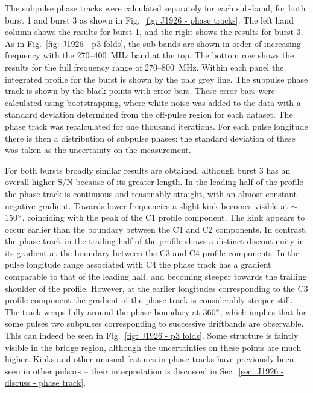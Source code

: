 The subpulse phase tracks were calculated separately for each sub-band, for both burst 1 and burst 3 as shown in Fig.~\ref{fig: J1926 - phase tracks}. The left hand column shows the results for burst 1, and the right shows the results for burst 3. As in Fig.~\ref{fig: J1926 - p3 folds}, the sub-bands are shown in order of increasing frequency with the 270--400~MHz band at the top. The bottom row shows the results for the full frequency range of 270--800~MHz. Within each panel the integrated profile for the burst is shown by the pale grey line. The subpulse phase track is shown by the black points with error bars. These error bars were calculated using bootstrapping, where white noise was added to the data with a standard deviation determined from the off-pulse region for each dataset. The phase track was recalculated for one thousand iterations. For each pulse longitude there is then a distribution of subpulse phases: the standard deviation of these was taken as the uncertainty on the measurement.

For both bursts broadly similar results are obtained, although burst 3 has an overall higher S/N because of its greater length. In the leading half of the profile the phase track is continuous and reasonably straight, with an almost constant negative gradient. Towards lower frequencies a slight kink becomes visible at $\sim$150$^\circ$, coinciding with the peak of the C1 profile component. The kink appears to occur earlier than the boundary between the C1 and C2 components. In contrast, the phase track in the trailing half of the profile shows a distinct discontinuity in its gradient at the boundary between the C3 and C4 profile components. In the pulse longitude range associated with C4 the phase track has a gradient comparable to that of the leading half, and becoming steeper towards the trailing shoulder of the profile. However, at the earlier longitudes corresponding to the C3 profile component the gradient of the phase track is considerably steeper still. The track wraps fully around the phase boundary at $360^\circ$, which implies that for some pulses two subpulses corresponding to successive driftbands are observable. This can indeed be seen in Fig.~\ref{fig: J1926 - p3 folds}. Some structure is faintly visible in the bridge region, although the uncertainties on these points are much higher. Kinks and other unusual features in phase tracks have previously been seen in other pulsars -- their interpretation is discussed in Sec.~\ref{sec: J1926 - discuss - phase track}.

